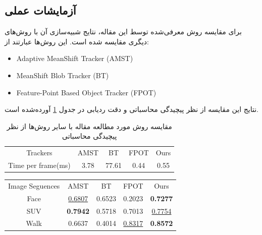 \documentclass[paper=a4, fontsize=12pt]{article} %
\begin{document}
\subsection{ آزمایشات عملی}
برای مقایسه روش معرفی‌شده توسط این مقاله، نتایج شبیه‌سازی آن با روش‌های دیگری مقایسه شده است. این روش‌ها عبارتند از:
\begin{itemize}


\item	Adaptive MeanShift Tracker (AMST)
\item	MeanShift Blob Tracker (BT)
\item	Feature-Point Based Object Tracker (FPOT)
\end{itemize}

نتایج این مقایسه از نظر پیچیدگی محاسباتی و دقت ردیابی در جدول \ref{tab1} آورده‌شده است.
\begin{table}

\centering
\caption{ مقایسه روش مورد مطالعه مقاله با سایر روش‌ها از نظر پیچیدگی محاسباتی}

\label{tab1}

\begin{tabular}{|c|c|c|c|c|}

\hline
\cline{1-5} Trackers & AMST & BT& FPOT & Ours\\
\cline{1-5} Time per frame(ms) & 3.78 & 77.61 & 0.44 & 0.55 \\
\hline
\end{tabular}
\end{table}

\begin{table}
\centering
\label{tab2}
\begin{tabular}{|c|c|c|c|c|}

\hline
\cline{1-5} Image Seguences & AMST & BT& FPOT & Ours\\
\cline{1-5} Face & \underline{ 0.6807} & 0.6523 & 0.2023 & \textbf{ 0.7277} \\
\cline{1-5} SUV & \textbf{ 0.7942} & 0.5718 & 0.7013 & \underline{0.7754}\\
\cline{1-5} Walk & 0.6637 & 0.4014 & \underline{0.8317} & \textbf{0.8572} \\

\hline

\end{tabular}
\end{table}
\end{document}

